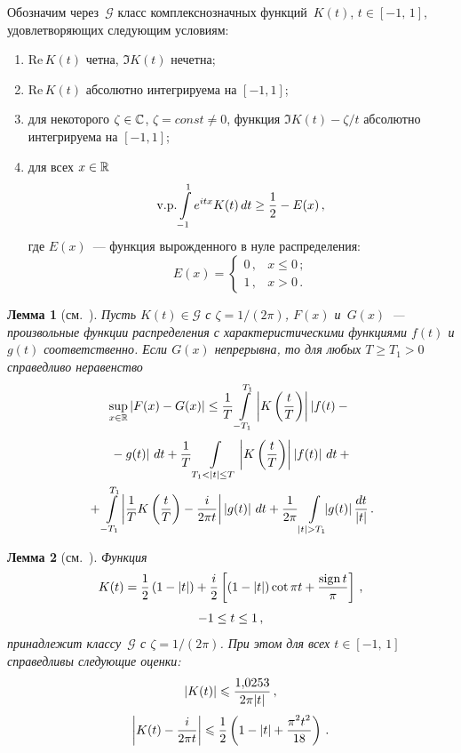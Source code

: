 \begin{multicols}{2}
Обозначим через~$\mathcal G$ класс комплекснозначных функций~$K(t)$,
$t\in[-1,\,1]$, удовлетворяющих следующим условиям:
\begin{enumerate}[($i$)]
\item $\mathrm{Re}\, K(t)$ четна, $\Im K(t)$ нечетна;
\item $\mathrm{Re}\, K(t)$ абсолютно интегрируема на $[-1,1]$;
\item для некоторого $\zeta\in\mathbb C$, $\zeta=const\neq0$, функция
$\Im K(t)-\zeta/t$ абсолютно {ин\-те\-гри\-ру\-е\-ма} на $[-1,1]$;
\item для всех $x\in\mathbb R$
$$
\mathrm{v.p.}\int\limits_{-1}^1{e^{itx}K(t)}\,dt\ge \displaystyle\frac{\displaystyle 1\mathstrut}{\displaystyle 2\mathstrut}-E(x)\,,
$$
где $E(x)$~--- функция вырожденного в нуле распределения:
$$ E(x)=
\begin{cases}
0\,,&x\le0\,;\\
1\,,&x> 0\,.
\end{cases}
$$
\end{enumerate}

\smallskip

\noindent
\textbf{Лемма 1} (см.~\cite{Prawitz1972}). %
\textit{Пусть $K(t)\in \mathcal G$ с $\zeta=1/(2\pi)$, $F(x)$ и~$G(x)$~---
произвольные функции распределения с характеристическими функциями
$f(t)$ и $g(t)$ соответственно. Если $G(x)$ непрерывна, то для любых
$T\ge T_1>0$ справедливо неравенство}
\begin{multline*}
\sup_{x\in\R}\left|F(x)-G(x)\right|\le
\fr{1}{T}\int\limits_{-T_1}^{T_1}\left|K\left(\fr
{t}{T}\right)\right| \left|f(t)-{}\right.\\[3pt]
\left.{}-g(t)\right|\,dt+\fr{1}{T}\int\limits_{T_1<|t|\le
T}{\left|K\left(\fr{t}{T}\right)\right|\left|f(t)\right|\,dt}+{}\\
{}+\int\limits_{-T_1}^{T_1}\!\left|\fr{1}{T} K\left(\fr{t}{T}\right)-\fr {i}{2\pi t}
\right|\left|g(t)\right|\,dt+
\fr{1}{2\pi}\int\limits_{|t|>T_1}\!\!\!\left|g(t)\right|\fr{dt}{|t|}\,.\hspace*{-0.153pt}
\end{multline*}

\bigskip

\noindent
\textbf{Лемма 2} (см.~\cite{Prawitz1972}). %
\textit{Функция
\begin{multline*}
K(t)=\displaystyle\frac{\displaystyle 1\mathstrut}{\displaystyle 2\mathstrut}\left(1-|t|\right)+\displaystyle\frac{\displaystyle i\mathstrut}{\displaystyle 2\mathstrut}\left[(1-|t|)\cot \pi t+ \displaystyle\frac{\displaystyle \mathrm{sign}\,
t\mathstrut}{\displaystyle \pi\mathstrut}\right]\,,\\[3pt]
-1\le t\le1\,,
\end{multline*}
принадлежит классу~$\mathcal G$ с $\zeta=1/(2\pi)$. При этом для
всех $t\in [-1,\,1]$ справедливы следующие оценки:}
$$
\left| K(t)\right| \leqslant \displaystyle\frac{\displaystyle 1{,}0253\mathstrut}{\displaystyle 2\pi|t|\mathstrut}\,,
$$
$$
\left| K(t)-\displaystyle\frac{\displaystyle i\mathstrut}{\displaystyle 2\pi t\mathstrut}\right| \leqslant \displaystyle\frac{\displaystyle 1\mathstrut}{\displaystyle 2\mathstrut}\left(1-|t|+
\displaystyle\frac{\displaystyle \pi^2t^2\mathstrut}{\displaystyle 18\mathstrut}\right)\,.
$$


\end{multicols}
